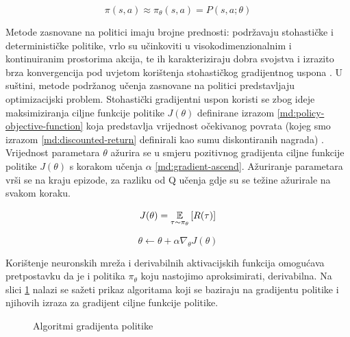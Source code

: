 \begin{equation}
    \label{md:policy-param}
    \pi(s, a) \approx \pi_\theta(s,a) = P(s, a; \theta) 
\end{equation}

\bigskip

Metode zasnovane na politici  imaju brojne prednosti: podržavaju stohastičke i determinističke politike, vrlo su učinkoviti u visokodimenzionalnim i kontinuiranim prostorima akcija, te ih karakteriziraju dobra svojstva i izrazito brza konvergencija pod uvjetom korištenja stohastičkog gradijentnog uspona  \cite{5. prezza}. U suštini, metode podržanog učenja zasnovane na politici predstavljaju optimizacijski problem. Stohastički gradijentni uspon koristi se zbog ideje maksimiziranja ciljne funkcije politike  $J(\theta)$ definirane izrazom \ref{md:policy-objective-function} koja predstavlja vrijednost očekivanog povrata (kojeg smo izrazom \ref{md:discounted-return} definirali kao sumu diskontiranih nagrada) \cite{https://medium.com/@thechrisyoon/deriving-policy-gradients-and-implementing-reinforce-f887949bd63}. Vrijednost parametara $\theta$ ažurira se u smjeru pozitivnog gradijenta ciljne funkcije politike $J(\theta)$ s korakom učenja $\alpha$ \ref{md:gradient-ascend}. Ažuriranje parametara vrši se na kraju epizode, za razliku od Q učenja gdje su se težine ažurirale na svakom koraku.

\begin{equation}
    \label{md:policy-objective-function}
    J(\theta) = \operatorname*{\mathbb{E}}_{\tau \sim \pi_\theta} \left[ R(\tau) \right]
\end{equation}

\begin{equation}
    \label{md:gradient-ascend}
    \theta \leftarrow \theta + \alpha \nabla_\theta J(\theta)
\end{equation}

\bigskip

Korištenje neuronskih mreža i derivabilnih aktivacijskih funkcija omogućava pretpostavku da je i politika $\pi_\theta$ koju nastojimo aproksimirati, derivabilna. Na slici \ref{fig:policy-gradient-algos} nalazi se sažeti prikaz algoritama koji se baziraju na gradijentu politike  i njihovih izraza za gradijent ciljne funkcije politike.

\begin{figure}[H]
    \centering
    \caption{Algoritmi gradijenta politike \cite{https://www.andrew.cmu.edu/course/10-703/slides/Lecture_PG-NatGrad-10-8-2018.pdf}}
    \label{fig:policy-gradient-algos}
\end{figure}

